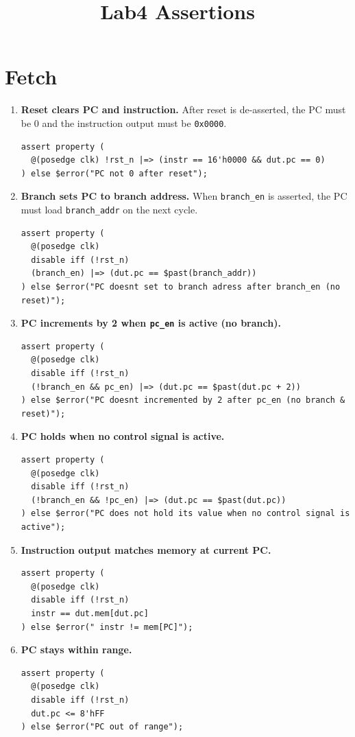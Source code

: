 \documentclass[11pt,a4paper]{article}
\title{Lab4 Assertions}
\author{}
\date{}
\begin{document}
\maketitle

\section{Fetch}

\begin{enumerate}

\item \textbf{Reset clears PC and instruction.}
After reset is de-asserted, the PC must be 0 and the instruction output must be \texttt{0x0000}.
\begin{lstlisting}
assert property (
  @(posedge clk) !rst_n |=> (instr == 16'h0000 && dut.pc == 0)
) else $error("PC not 0 after reset");
\end{lstlisting}

\item \textbf{Branch sets PC to branch address.}
When \texttt{branch\_en} is asserted, the PC must load \texttt{branch\_addr} on the next cycle.
\begin{lstlisting}
assert property (
  @(posedge clk)
  disable iff (!rst_n)
  (branch_en) |=> (dut.pc == $past(branch_addr))
) else $error("PC doesnt set to branch adress after branch_en (no reset)");
\end{lstlisting}

\item \textbf{PC increments by 2 when \texttt{pc\_en} is active (no branch).}
\begin{lstlisting}
assert property (
  @(posedge clk)
  disable iff (!rst_n)
  (!branch_en && pc_en) |=> (dut.pc == $past(dut.pc + 2))
) else $error("PC doesnt incremented by 2 after pc_en (no branch & reset)");
\end{lstlisting}

\item \textbf{PC holds when no control signal is active.}
\begin{lstlisting}
assert property (
  @(posedge clk)
  disable iff (!rst_n)
  (!branch_en && !pc_en) |=> (dut.pc == $past(dut.pc))
) else $error("PC does not hold its value when no control signal is active");
\end{lstlisting}

\item \textbf{Instruction output matches memory at current PC.}
\begin{lstlisting}
assert property (
  @(posedge clk)
  disable iff (!rst_n)
  instr == dut.mem[dut.pc]
) else $error(" instr != mem[PC]");
\end{lstlisting}

\item \textbf{PC stays within range.}
\begin{lstlisting}
assert property (
  @(posedge clk)
  disable iff (!rst_n)
  dut.pc <= 8'hFF
) else $error("PC out of range");
\end{lstlisting}

\end{enumerate}
\end{document}
